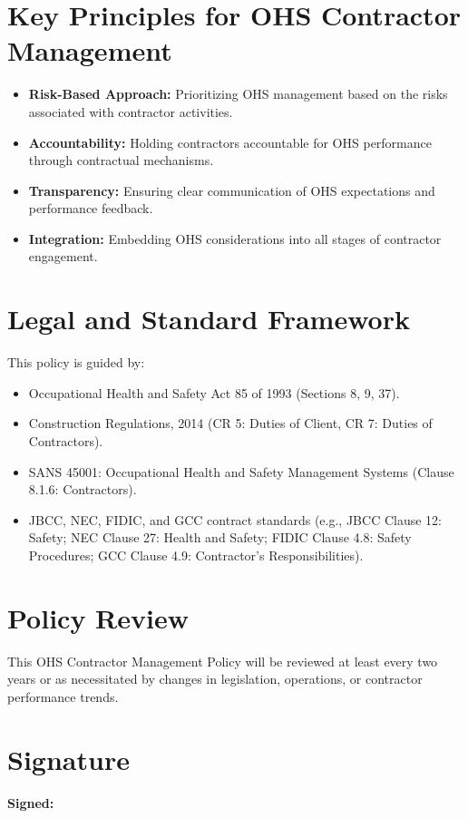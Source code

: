 \documentclass[12pt]{article}
\begin{document}
\section{Key Principles for OHS Contractor Management}
\begin{itemize}
    \item \textbf{Risk-Based Approach:} Prioritizing OHS management based on the risks associated with contractor activities.
    \item \textbf{Accountability:} Holding contractors accountable for OHS performance through contractual mechanisms.
    \item \textbf{Transparency:} Ensuring clear communication of OHS expectations and performance feedback.
    \item \textbf{Integration:} Embedding OHS considerations into all stages of contractor engagement.
\end{itemize}

\section{Legal and Standard Framework}
This policy is guided by:
\begin{itemize}
    \item Occupational Health and Safety Act 85 of 1993 (Sections 8, 9, 37).
    \item Construction Regulations, 2014 (CR 5: Duties of Client, CR 7: Duties of Contractors).
    \item SANS 45001: Occupational Health and Safety Management Systems (Clause 8.1.6: Contractors).
    \item JBCC, NEC, FIDIC, and GCC contract standards (e.g., JBCC Clause 12: Safety; NEC Clause 27: Health and Safety; FIDIC Clause 4.8: Safety Procedures; GCC Clause 4.9: Contractor’s Responsibilities).
\end{itemize}

\section{Policy Review}
This OHS Contractor Management Policy will be reviewed at least every two years or as necessitated by changes in legislation, operations, or contractor performance trends.

\section{Signature}
\textbf{Signed:}
\end{document}
